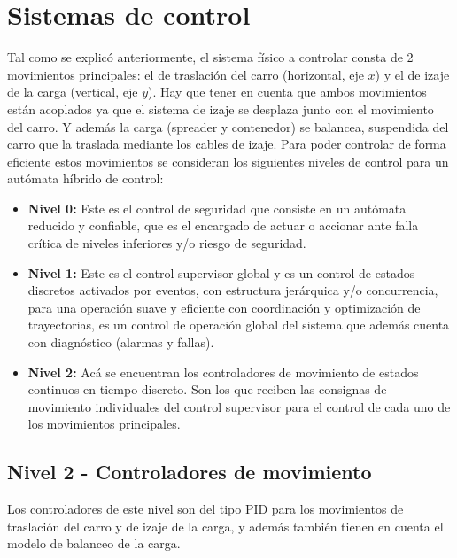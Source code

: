 \documentclass[11pt]{article}
\begin{document}


\section{Sistemas de control}

Tal como se explicó anteriormente, el sistema físico a controlar consta de 2 movimientos principales: el de traslación del carro (horizontal, eje $x$) y el de izaje de la carga (vertical, eje $y$). Hay que tener en cuenta que ambos movimientos están acoplados ya que el sistema de izaje se desplaza junto con el movimiento del carro. Y además la carga (spreader y contenedor) se balancea, suspendida del carro que la traslada mediante los cables de izaje. Para poder controlar de forma eficiente estos movimientos se consideran los siguientes niveles de control para un autómata híbrido de control:

\begin{itemize}
	\item \textbf{Nivel 0:} Este es el control de seguridad que consiste en un autómata reducido y confiable, que es el encargado de actuar o accionar ante falla crítica de niveles inferiores y/o riesgo de seguridad.
	\item \textbf{Nivel 1:} Este es el control supervisor global y es un control de estados discretos activados por eventos, con estructura jerárquica y/o concurrencia, para una operación suave y eficiente con coordinación y optimización de trayectorias, es un control de operación global del sistema que además cuenta con diagnóstico (alarmas y fallas).
	\item \textbf{Nivel 2:} Acá se encuentran los controladores de movimiento de estados continuos en tiempo discreto. Son los que reciben las consignas de movimiento individuales del control supervisor para el control de cada uno de los movimientos principales.
\end{itemize}

\subsection{Nivel 2 - Controladores de movimiento}
Los controladores de este nivel son del tipo PID para los movimientos de traslación del carro y de izaje de la carga, y además también tienen en cuenta el modelo de balanceo de la carga.
\end{document}
